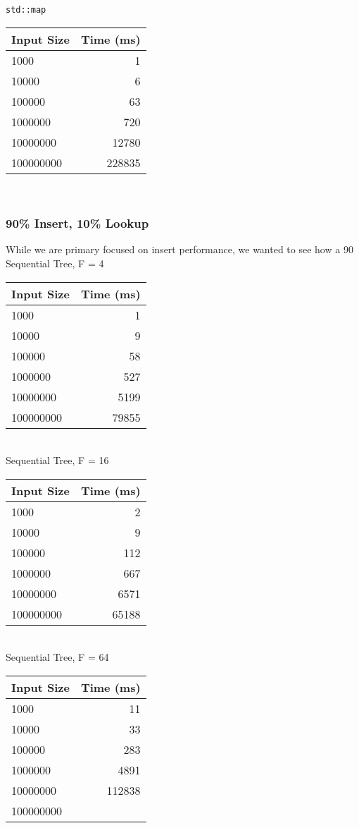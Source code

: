 \documentclass{sig-alternate}
\begin{document}
\texttt{std::map}\\
\begin{tabular}{| l | r |}
  \hline
  Input Size & Time (ms)\\  \hline
  1000			&	1	\\
  10000			&	6	\\
  100000		&	63	\\
  1000000		&	720	\\
  10000000		&	12780	\\
  100000000		&	228835	\\
  \hline
\end{tabular}\\

\subsubsection{90\% Insert, 10\% Lookup}
While we are primary focused on insert performance, we wanted to see how a 90%
Sequential Tree, F = 4\\
\begin{tabular}{| l | r |}
  \hline
  Input Size & Time (ms)\\  \hline
  1000			&	1	\\
  10000			&	9	\\
  100000		&	58	\\
  1000000		&	527	\\
  10000000		&	5199	\\
  100000000		&	79855	\\
  \hline
\end{tabular} \\

Sequential Tree, F = 16\\
\begin{tabular}{| l | r |}
  \hline
  Input Size & Time (ms)\\  \hline
  1000			&	2	\\
  10000			&	9	\\
  100000		&	112	\\
  1000000		&	667	\\
  10000000		&	6571	\\
  100000000		&	65188	\\
  \hline
\end{tabular} \\

Sequential Tree, F = 64\\
\begin{tabular}{| l | r |}
  \hline
  Input Size & Time (ms)\\  \hline
  1000			&	11	\\
  10000			&	33	\\
  100000		&	283	\\
  1000000		&	4891	\\
  10000000		&	112838	\\
  100000000		&	\\
  \hline
\end{tabular} \\
\end{document}
